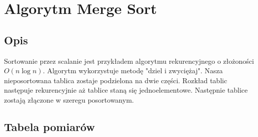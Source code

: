 \section{Algorytm Merge Sort }
\subsection{Opis}
Sortowanie przez scalanie jest przykładem algorytmu rekurencyjnego o złożoności $O(n\log{}n)$. Algorytm wykorzystuje metodę "dziel i zwyciężaj". Nasza nieposortowana tablica zostaje podzielona na dwie części. Rozkład tablic następuje rekurencyjnie aż tablice staną się jednoelementowe. Następnie tablice zostają złączone w szeregu posortowanym.
\subsection{Tabela pomiarów}